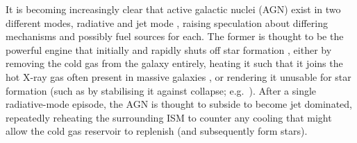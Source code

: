 \documentclass[a4paper,fleqn,usenatbib]{mnras}
\begin{document}


	It is becoming increasingly clear that active galactic nuclei (AGN) exist in two different modes, radiative and jet mode \citep[e.g.][]{Antonucci2012, Heckman2014}, raising speculation about differing mechanisms and possibly fuel sources for each. The former is thought to be the powerful engine that initially and rapidly shuts off star formation \citep[e.g.][]{Thomas2005, Thomas2010}, either by removing the cold gas from the galaxy entirely, heating it such that it joins the hot X-ray gas often present in massive galaxies \citep[e.g.][]{OSullivan2001}, or rendering it unusable for star formation (such as by stabilising it against collapse; e.g.\ \citealt{Martig2009}). After a single radiative-mode episode, the AGN is thought to subside to become jet dominated, repeatedly reheating the surrounding ISM to counter any cooling that might allow the cold gas reservoir to replenish (and subsequently form stars). 
\end{document}
